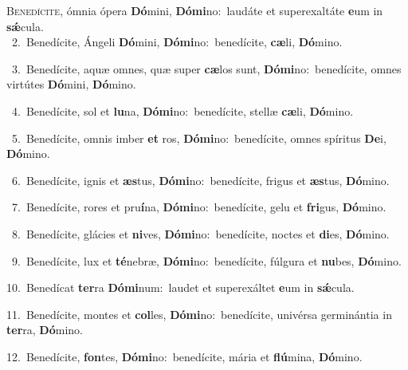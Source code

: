 \lettrine{\initial\textcolor{\initialcolor}{B}}{enedícite,} ómnia ópera \textbf{Dó}\-mini, \textbf{Dó}\-\textbf{mi}no:~\star laudáte et superexaltáte \textbf{e}\-um in \textbf{sǽ}\-cula.\\
{\numbfont\textcolor{\numbcolor}{~2.}}~Benedícite, Ángeli \textbf{Dó}\-mini, \textbf{Dó}\-\textbf{mi}no:~\star benedícite, \textbf{cæ}\-li, \textbf{Dó}\-mino.\par
{\numbfont\textcolor{\numbcolor}{~3.}}~Benedícite, aquæ omnes, quæ super \textbf{cæ}\-los sunt, \textbf{Dó}\-\textbf{mi}no:~\star benedícite, omnes virtútes \textbf{Dó}\-mini, \textbf{Dó}\-mino.\par
{\numbfont\textcolor{\numbcolor}{~4.}}~Benedícite, sol et \textbf{lu}\-na, \textbf{Dó}\-\textbf{mi}no:~\star benedícite, stellæ \textbf{cæ}\-li, \textbf{Dó}\-mino.\par
{\numbfont\textcolor{\numbcolor}{~5.}}~Benedícite, omnis imber \textbf{et} ros, \textbf{Dó}\-\textbf{mi}no:~\star benedícite, omnes spíritus \textbf{De}\-i, \textbf{Dó}\-mino.\par
{\numbfont\textcolor{\numbcolor}{~6.}}~Benedícite, ignis et \textbf{æs}\-tus, \textbf{Dó}\-\textbf{mi}no:~\star benedícite, frigus et \textbf{æs}\-tus, \textbf{Dó}\-mino.\par
{\numbfont\textcolor{\numbcolor}{~7.}}~Benedícite, rores et pru\-\textbf{í}\-na, \textbf{Dó}\-\textbf{mi}no:~\star benedícite, gelu et \textbf{fri}\-gus, \textbf{Dó}\-mino.\par
{\numbfont\textcolor{\numbcolor}{~8.}}~Benedícite, glácies et \textbf{ni}\-ves, \textbf{Dó}\-\textbf{mi}no:~\star benedícite, noctes et \textbf{di}\-es, \textbf{Dó}\-mino.\par
{\numbfont\textcolor{\numbcolor}{~9.}}~Benedícite, lux et \textbf{té}\-nebræ, \textbf{Dó}\-\textbf{mi}no:~\star benedícite, fúlgura et \textbf{nu}\-bes, \textbf{Dó}\-mino.\par
{\numbfont\textcolor{\numbcolor}{10.}}~Benedícat \textbf{ter}\-ra \textbf{Dó}\-\textbf{mi}num:~\star laudet et superexáltet \textbf{e}\-um in \textbf{sǽ}\-cula.\par
{\numbfont\textcolor{\numbcolor}{11.}}~Benedícite, montes et \textbf{col}\-les, \textbf{Dó}\-\textbf{mi}no:~\star benedícite, univérsa germinántia in \textbf{ter}\-ra, \textbf{Dó}\-mino.\par
{\numbfont\textcolor{\numbcolor}{12.}}~Benedícite, \textbf{fon}\-tes, \textbf{Dó}\-\textbf{mi}no:~\star benedícite, mária et \textbf{flú}\-mina, \textbf{Dó}\-mino.\par
